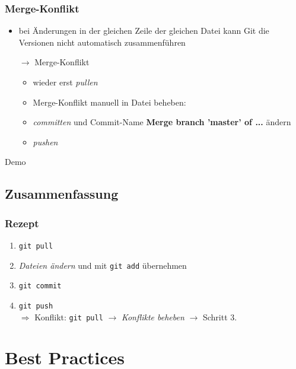 \documentclass[accentcolor=tud8b,colorbacktitle,inverttitle,landscape,german,presentation,t]{tudbeamer}
\begin{document}
			\begin{frame}
				\frametitle{Merge-Konflikt}
					\begin{itemize}
						\item bei Änderungen in der gleichen Zeile der gleichen Datei kann Git die Versionen nicht automatisch zusammenführen
						\item[$\rightarrow$] Merge-Konflikt
						\begin{itemize}
							\item wieder erst \textit{pullen}
							\item Merge-Konflikt manuell in Datei beheben:\\
							
							\item \textit{committen} und Commit-Name \textbf{Merge branch 'master' of  ...} ändern
							\item \textit{pushen}
						\end{itemize}
					\end{itemize}
				
			\end{frame}
			
			\begin{frame}
				Demo
			\end{frame}
		
	\subsection{Zusammenfassung}
		\begin{frame}
		\frametitle{Rezept}
			\begin{enumerate}
				\item \texttt{git pull}
				\item \textit{Dateien ändern} und mit \texttt{git add} übernehmen
				\item \texttt{git commit}
				\item \texttt{git push}\\
				$\Rightarrow$ Konflikt: \texttt{git pull} $\rightarrow$ \textit{Konflikte beheben} $\rightarrow$ Schritt 3.
				
			\end{enumerate}
		\end{frame}
		
	\section{Best Practices}
\end{document}
